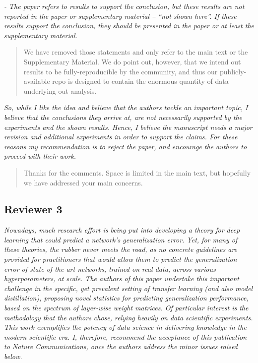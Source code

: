 \documentclass[11pt]{article}
\begin{document}
\noindent
\emph{%
- The paper refers to results to support the conclusion, but these results are not reported in the paper or supplementary material -- ``not shown here''. If these results support the conclusion, they should be presented in the paper or at least the supplementary material.
}

\begin{quote}
We have removed those statements and only refer to the main text or the Supplementary Material.
We do point out, however, that we intend out results to be fully-reproducible by the community, and thus our publicly-available repo is designed to contain the enormous quantity of data underlying out analysis.
\end{quote}

\noindent
\emph{%
So, while I like the idea and believe that the authors tackle an important topic, I believe that the conclusions they arrive at, are not necessarily supported by the experiments and the shown results. Hence, I believe the manuscript needs a major revision and additional experiments in order to support the claims. For these reasons my recommendation is to reject the paper, and encourage the authors to proceed with their work.
}

\begin{quote}
Thanks for the comments.
Space is limited in the main text, but hopefully we have addressed your main concerns.
\end{quote}


\subsection*{Reviewer 3}

\noindent
\emph{%
Nowadays, much research effort is being put into developing a theory for deep learning that could predict a network's generalization error. Yet, for many of these theories, the rubber never meets the road, as no concrete guidelines are provided for practitioners that would allow them to predict the generalization error of state-of-the-art networks, trained on real data, across various hyperparameters, at scale. The authors of this paper undertake this important challenge in the specific, yet prevalent setting of transfer learning (and also model distillation), proposing novel statistics for predicting generalization performance, based on the spectrum of layer-wise weight matrices. Of particular interest is the methodology that the authors chose, relying heavily on data scientific experiments. This work exemplifies the potency of data science in delivering knowledge in the modern scientific era. I, therefore, recommend the acceptance of this publication to Nature Communications,
once the authors address the minor issues raised below.
}
\end{document}
